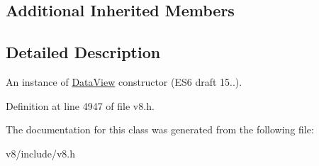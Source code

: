 \subsection*{Additional Inherited Members}


\subsection{Detailed Description}
An instance of \mbox{\hyperlink{classv8_1_1DataView}{Data\+View}} constructor (E\+S6 draft 15..). 

Definition at line 4947 of file v8.\+h.



The documentation for this class was generated from the following file\+:\begin{DoxyCompactItemize}
\item 
v8/include/v8.\+h\end{DoxyCompactItemize}
